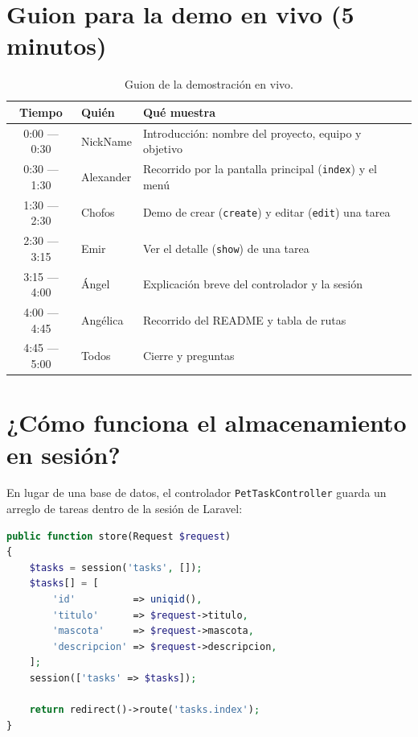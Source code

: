 \documentclass[11pt,a4paper]{article}
\begin{document}
\section{Guion para la demo en vivo (5 minutos)}

\begin{table}[H]
\centering
\renewcommand{\arraystretch}{1.25}
\begin{tabular}{|c|l|l|p{6cm}|}
\hline
\textbf{Tiempo} & \textbf{Quién} & \textbf{Qué muestra} \\ \hline
0:00 --- 0:30 & NickName  & Introducción: nombre del proyecto, equipo y objetivo \\ \hline
0:30 --- 1:30 & Alexander & Recorrido por la pantalla principal (\texttt{index}) y el menú \\ \hline
1:30 --- 2:30 & Chofos    & Demo de crear (\texttt{create}) y editar (\texttt{edit}) una tarea \\ \hline
2:30 --- 3:15 & Emir      & Ver el detalle (\texttt{show}) de una tarea \\ \hline
3:15 --- 4:00 & Ángel     & Explicación breve del controlador y la sesión \\ \hline
4:00 --- 4:45 & Angélica  & Recorrido del README y tabla de rutas \\ \hline
4:45 --- 5:00 & Todos     & Cierre y preguntas \\ \hline
\end{tabular}
\caption{Guion de la demostración en vivo.}
\end{table}

\section{¿Cómo funciona el almacenamiento en sesión?}

En lugar de una base de datos, el controlador \texttt{PetTaskController} guarda un arreglo de tareas dentro de la sesión de Laravel:

\begin{lstlisting}[language=PHP, caption={Ejemplo simplificado del método \texttt{store()}}]
public function store(Request $request)
{
    $tasks = session('tasks', []);
    $tasks[] = [
        'id'          => uniqid(),
        'titulo'      => $request->titulo,
        'mascota'     => $request->mascota,
        'descripcion' => $request->descripcion,
    ];
    session(['tasks' => $tasks]);

    return redirect()->route('tasks.index');
}
\end{lstlisting}
\end{document}
